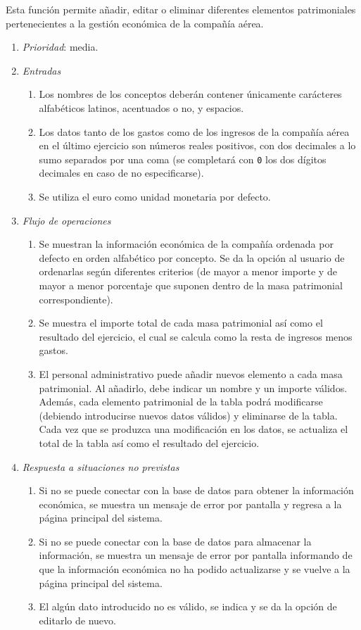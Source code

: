 

 \label{fun:editareconomica}
	Esta función permite añadir, editar o eliminar diferentes elementos patrimoniales pertenecientes a la gestión económica de la compañía aérea.

	\begin{enumerate}
		\item \textit{Prioridad}: media.
		\item \textit{Entradas}
		\begin{enumerate}
			\item Los nombres de los conceptos deberán contener únicamente carácteres alfabéticos latinos, acentuados o no, y espacios.
			\item Los datos tanto de los gastos como de los ingresos de la compañía aérea en el último ejercicio son números reales positivos, con dos decimales a lo sumo separados por una coma (se completará con \verb|0| los dos dígitos decimales en caso de no especificarse).
			\item Se utiliza el euro como unidad monetaria por defecto.
		\end{enumerate}
		\item \textit{Flujo de operaciones}
		\begin{enumerate}
			\item Se muestran la información económica de la compañía ordenada por defecto en orden alfabético por concepto. Se da la opción al usuario de ordenarlas según diferentes criterios (de mayor a menor importe y de mayor a menor porcentaje que suponen dentro de la masa patrimonial correspondiente).
			\item Se muestra el importe total de cada masa patrimonial así como el resultado del ejercicio, el cual se calcula como la resta de ingresos menos gastos.
			\item El personal administrativo puede añadir nuevos elemento a cada masa patrimonial. Al añadirlo, debe indicar un nombre y un importe válidos. Además, cada elemento patrimonial de la tabla podrá modificarse (debiendo introducirse nuevos datos válidos) y eliminarse de la tabla. Cada vez que se produzca una modificación en los datos, se actualiza el total de la tabla así como el resultado del ejercicio.
		\end{enumerate}
		\item \textit{Respuesta a situaciones no previstas}
		\begin{enumerate}
			\item Si no se puede conectar con la base de datos para obtener la información económica, se muestra un mensaje de error por pantalla y regresa a la página principal del sistema.
			\item Si no se puede conectar con la base de datos para almacenar la información, se muestra un mensaje de error por pantalla informando de que la información económica no ha podido actualizarse y se vuelve a la página principal del sistema.
			\item El algún dato introducido no es válido, se indica y se da la opción de editarlo de nuevo.
		\end{enumerate}
	\end{enumerate}
